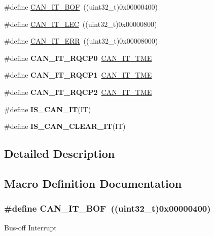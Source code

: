 \begin{DoxyCompactItemize}
\item 
\#define \hyperlink{group___c_a_n__interrupts_gad63c39e6237aa07681a1f8ce2ff9e167}{C\-A\-N\-\_\-\-I\-T\-\_\-\-B\-O\-F}~((uint32\-\_\-t)0x00000400)
\item 
\#define \hyperlink{group___c_a_n__interrupts_gad670b6f001bf67f24e17d91ada50a61c}{C\-A\-N\-\_\-\-I\-T\-\_\-\-L\-E\-C}~((uint32\-\_\-t)0x00000800)
\item 
\#define \hyperlink{group___c_a_n__interrupts_ga65f1781c9165a2e9b5f77f1ed3990741}{C\-A\-N\-\_\-\-I\-T\-\_\-\-E\-R\-R}~((uint32\-\_\-t)0x00008000)
\item 
\hypertarget{group___c_a_n__interrupts_ga0c57058d6d14b2baa24a4895975b1371}{\#define {\bfseries C\-A\-N\-\_\-\-I\-T\-\_\-\-R\-Q\-C\-P0}~\hyperlink{group___c_a_n__interrupts_ga619e36230fa2eb089a7c1936b5004eb9}{C\-A\-N\-\_\-\-I\-T\-\_\-\-T\-M\-E}}\label{group___c_a_n__interrupts_ga0c57058d6d14b2baa24a4895975b1371}

\item 
\hypertarget{group___c_a_n__interrupts_ga42e5c8e89e0f06f3250916fcfb21dc22}{\#define {\bfseries C\-A\-N\-\_\-\-I\-T\-\_\-\-R\-Q\-C\-P1}~\hyperlink{group___c_a_n__interrupts_ga619e36230fa2eb089a7c1936b5004eb9}{C\-A\-N\-\_\-\-I\-T\-\_\-\-T\-M\-E}}\label{group___c_a_n__interrupts_ga42e5c8e89e0f06f3250916fcfb21dc22}

\item 
\hypertarget{group___c_a_n__interrupts_gacc634c3e29cdc9622081021dcda3127b}{\#define {\bfseries C\-A\-N\-\_\-\-I\-T\-\_\-\-R\-Q\-C\-P2}~\hyperlink{group___c_a_n__interrupts_ga619e36230fa2eb089a7c1936b5004eb9}{C\-A\-N\-\_\-\-I\-T\-\_\-\-T\-M\-E}}\label{group___c_a_n__interrupts_gacc634c3e29cdc9622081021dcda3127b}

\item 
\#define {\bfseries I\-S\-\_\-\-C\-A\-N\-\_\-\-I\-T}(I\-T)
\item 
\#define {\bfseries I\-S\-\_\-\-C\-A\-N\-\_\-\-C\-L\-E\-A\-R\-\_\-\-I\-T}(I\-T)
\end{DoxyCompactItemize}


\subsection{Detailed Description}


\subsection{Macro Definition Documentation}
\hypertarget{group___c_a_n__interrupts_gad63c39e6237aa07681a1f8ce2ff9e167}{
\subsubsection[{C\-A\-N\-\_\-\-I\-T\-\_\-\-B\-O\-F}]{\setlength{\rightskip}{0pt plus 5cm}\#define C\-A\-N\-\_\-\-I\-T\-\_\-\-B\-O\-F~((uint32\-\_\-t)0x00000400)}}\label{group___c_a_n__interrupts_gad63c39e6237aa07681a1f8ce2ff9e167}
Bus-\/off Interrupt 

